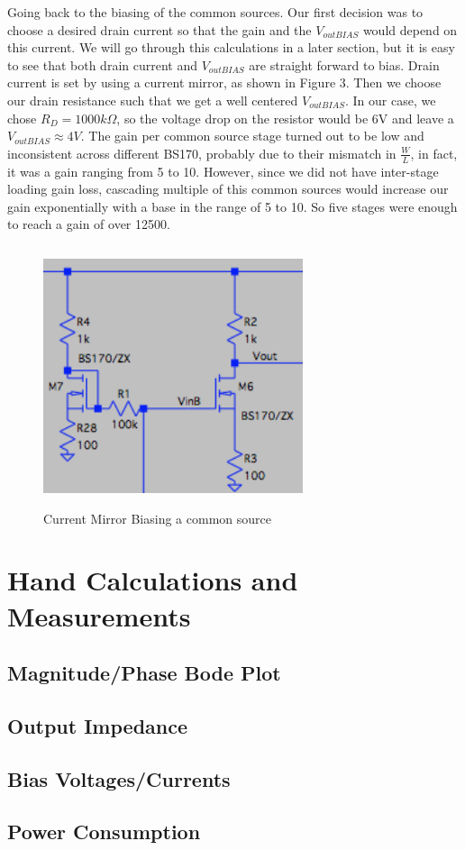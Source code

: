 \documentclass[11pt, twoside, letterpaper]{article}
\begin{document}
Going back to the biasing of the common sources. Our first decision was to choose a desired drain current so that the gain and the $V_{outBIAS}$
would depend on this current. We will go through this calculations in a later section, but it is easy to see that both drain current and 
$V_{outBIAS}$ are straight forward to bias. Drain current is set by using a current mirror, as shown in Figure 3. Then we choose our drain 
resistance such that we get a well centered $V_{outBIAS}$. In our case, we chose $R_D=1000k\Omega$, so the voltage drop on the resistor would be 
6V and leave a $V_{outBIAS}\approx 4V$. The gain per common source stage turned out to be low and inconsistent across different BS170, probably
due to their mismatch in $\frac{W}{L}$, in fact, it was a gain ranging from 5 to 10. However, since we did not have inter-stage loading gain loss,
cascading multiple of this common sources would increase our gain exponentially with a base in the range of 5 to 10. So five stages were enough
to reach a gain of over 12500.

\begin{figure}[htbp]
\begin{center}
\includegraphics[width=3in,height=3in]{CurrentMirror.png}
\caption{Current Mirror Biasing a common source}
\end{center}
\end{figure}



\section{Hand Calculations and Measurements}
\subsection*{Magnitude/Phase Bode Plot}
\subsection*{Output Impedance}
\subsection*{Bias Voltages/Currents}
\subsection*{Power Consumption}
\end{document}
